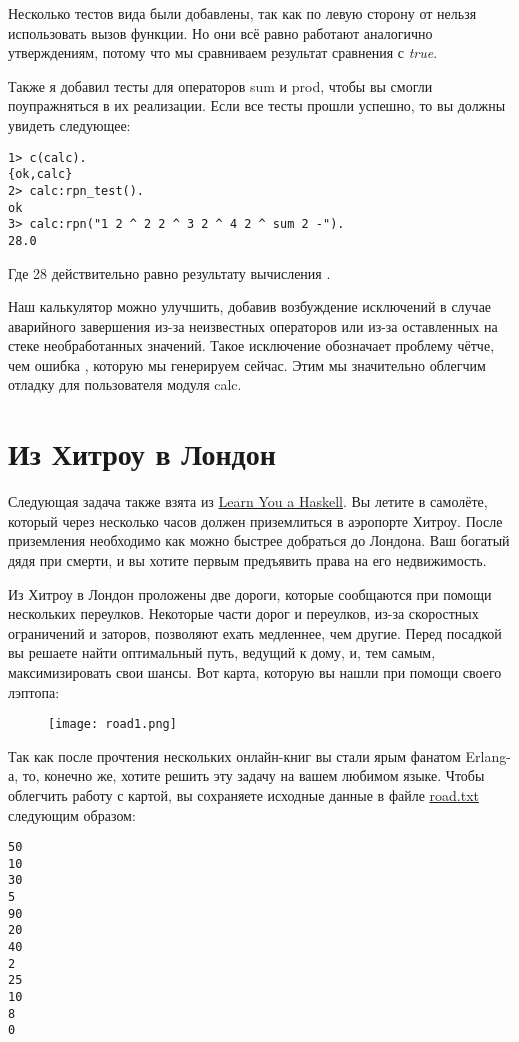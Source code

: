 Несколько тестов вида  были добавлены, так как по левую сторону от \ops{=\strut} нельзя использовать вызов функции.
Но они всё равно работают аналогично утверждениям, потому что мы сравниваем результат сравнения с \emph{true}.

Также я добавил тесты для операторов sum и prod, чтобы вы смогли поупражняться в их реализации.
Если все тесты прошли успешно, то вы должны увидеть следующее:
\begin{lstlisting}[style=erlang]
1> c(calc).
{ok,calc}
2> calc:rpn_test().
ok
3> calc:rpn("1 2 ^ 2 2 ^ 3 2 ^ 4 2 ^ sum 2 -").
28.0
\end{lstlisting}

Где 28 действительно равно результату вычисления .

Наш калькулятор можно улучшить, добавив возбуждение исключений  в случае аварийного завершения из\--за неизвестных операторов или из\--за оставленных на стеке необработанных значений.
Такое исключение обозначает проблему чётче, чем ошибка , которую мы генерируем сейчас.
Этим мы значительно облегчим отладку для пользователя модуля calc.

\section{Из Хитроу в Лондон}
\label{heathrow-to-london}
Следующая задача также взята из \href{http://learnyouahaskell.com/functionally-solving-problems#heathrow-to-london}{Learn You a Haskell}.
Вы летите в самолёте, который через несколько часов должен приземлиться в аэропорте Хитроу.
После приземления необходимо как можно быстрее добраться до Лондона.
Ваш богатый дядя при смерти, и вы хотите первым предъявить права на его недвижимость.

Из Хитроу в Лондон проложены две дороги, которые сообщаются при помощи нескольких переулков.
Некоторые части дорог и переулков, из\--за скоростных ограничений и заторов, позволяют ехать медленнее, чем другие.
Перед посадкой вы решаете найти оптимальный путь, ведущий к дому, и, тем самым, максимизировать свои шансы.
Вот карта, которую вы нашли при помощи своего лэптопа:
\begin{figure}[h!]
    \texttt{[image: road1.png]}
\end{figure}

Так как после прочтения нескольких онлайн\--книг вы стали ярым фанатом Erlang\--а, то, конечно же, хотите решить эту задачу на вашем любимом языке.
Чтобы облегчить работу с картой, вы сохраняете исходные данные в файле \href{http://learnyousomeerlang.com/static/erlang/road.txt}{road.txt} следующим образом:
\begin{lstlisting}[style=erlang]
50
10
30
5
90
20
40
2
25
10
8
0
\end{lstlisting}

